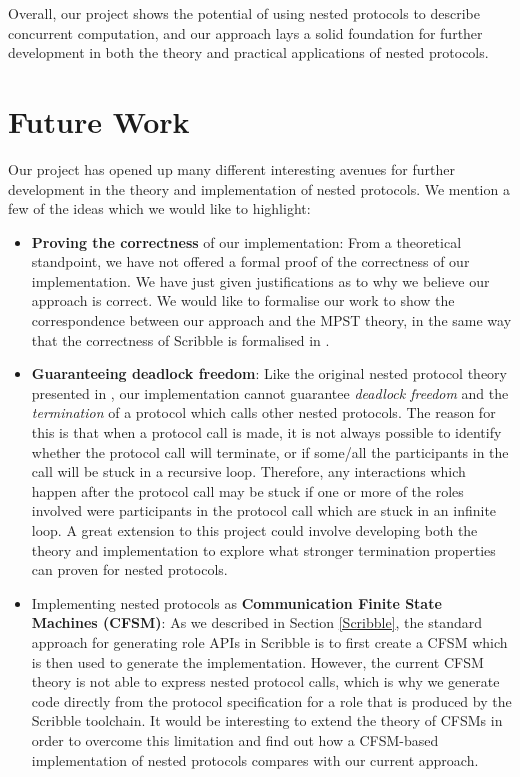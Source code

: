 \documentclass[12pt,twoside]{report}
\begin{document}
Overall, our project shows the potential of using nested protocols to describe concurrent computation, and our approach lays a solid foundation for further development in both the theory and practical applications of nested protocols.

\section{Future Work}
Our project has opened up many different interesting avenues for further development in the theory and implementation of nested protocols. We mention a few of the ideas which we would like to highlight:
\begin{itemize}
    \item \textbf{Proving the correctness} of our implementation: From a theoretical standpoint, we have not offered a formal proof of the correctness of our implementation. We have just given justifications as to why we believe our approach is correct. We would like to formalise our work to show the correspondence between our approach and the MPST theory, in the same way that the correctness of Scribble is formalised in \cite{featherweight}.
    \item \textbf{Guaranteeing deadlock freedom}: Like the original nested protocol theory presented in \cite{nestedprotocols}, our implementation cannot guarantee \textit{deadlock freedom} and the \textit{termination} of a protocol which calls other nested protocols. The reason for this is that when a protocol call is made, it is not always possible to identify whether the protocol call will terminate, or if some/all the participants in the call will be stuck in a recursive loop. Therefore, any interactions which happen after the protocol call may be stuck if one or more of the roles involved were participants in the protocol call which are stuck in an infinite loop. A great extension to this project could involve developing both the theory and implementation to explore what stronger termination properties can proven for nested protocols.
    \item Implementing nested protocols as \textbf{Communication Finite State Machines (CFSM)}: As we described in Section \ref{Scribble}, the standard approach for generating role APIs in Scribble is to first create a CFSM which is then used to generate the implementation. However, the current CFSM theory is not able to express nested protocol calls, which is why we generate code directly from the protocol specification for a role that is produced by the Scribble toolchain. It would be interesting to extend the theory of CFSMs in order to overcome this limitation and find out how a CFSM-based implementation of nested protocols compares with our current approach.

\end{itemize}
\end{document}
